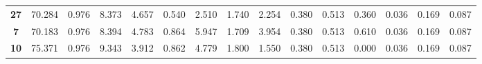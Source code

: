 \documentclass[withoutpreface,bwprint]{cumcmthesis} %
\begin{document}
\begin{table}[!h]
\begin{tabular}{@{}ccccccccccccccc@{}}
	\textbf{27}                                               & 70.284                                                         & 0.976                                                         & 8.373                                                        & 4.657                                                        & 0.540                                                        & 2.510                                                          & 1.740                                                          & 2.254                                                        & 0.380                                                        & 0.513                                                        & 0.360                                                           & 0.036                                                        & 0.169                                                         & 0.087                                                         \\
	\textbf{7}                                                & 70.183                                                         & 0.976                                                         & 8.394                                                        & 4.783                                                        & 0.864                                                        & 5.947                                                          & 1.709                                                          & 3.954                                                        & 0.380                                                        & 0.513                                                        & 0.610                                                           & 0.036                                                        & 0.169                                                         & 0.087                                                         \\
	\textbf{10}                                               & 75.371                                                         & 0.976                                                         & 9.343                                                        & 3.912                                                        & 0.862                                                        & 4.779                                                          & 1.800                                                          & 1.550                                                        & 0.380                                                        & 0.513                                                        & 0.000                                                           & 0.036                                                        & 0.169                                                         & 0.087                                                         \\ \bottomrule
\end{tabular}
\end{table}
\end{document}
